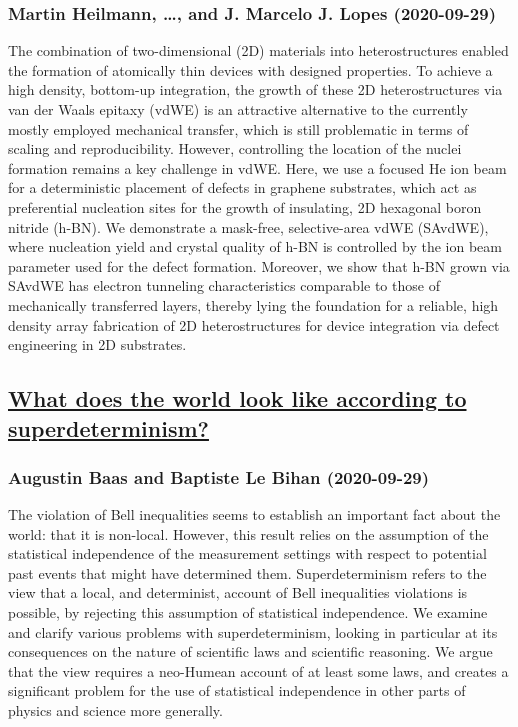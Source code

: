 \subsubsection*{Martin Heilmann, \dots, and J. Marcelo J. Lopes (2020-09-29)}
The combination of two-dimensional (2D) materials into heterostructures
enabled the formation of atomically thin devices with designed properties. To
achieve a high density, bottom-up integration, the growth of these 2D
heterostructures via van der Waals epitaxy (vdWE) is an attractive alternative
to the currently mostly employed mechanical transfer, which is still
problematic in terms of scaling and reproducibility. However, controlling the
location of the nuclei formation remains a key challenge in vdWE. Here, we use
a focused He ion beam for a deterministic placement of defects in graphene
substrates, which act as preferential nucleation sites for the growth of
insulating, 2D hexagonal boron nitride (h-BN). We demonstrate a mask-free,
selective-area vdWE (SAvdWE), where nucleation yield and crystal quality of
h-BN is controlled by the ion beam parameter used for the defect formation.
Moreover, we show that h-BN grown via SAvdWE has electron tunneling
characteristics comparable to those of mechanically transferred layers, thereby
lying the foundation for a reliable, high density array fabrication of 2D
heterostructures for device integration via defect engineering in 2D
substrates.

\subsection*{\href{http://arxiv.org/abs/2009.13908v1}{What does the world look like according to superdeterminism?}}
\subsubsection*{Augustin Baas and Baptiste Le Bihan (2020-09-29)}
The violation of Bell inequalities seems to establish an important fact about
the world: that it is non-local. However, this result relies on the assumption
of the statistical independence of the measurement settings with respect to
potential past events that might have determined them. Superdeterminism refers
to the view that a local, and determinist, account of Bell inequalities
violations is possible, by rejecting this assumption of statistical
independence. We examine and clarify various problems with superdeterminism,
looking in particular at its consequences on the nature of scientific laws and
scientific reasoning. We argue that the view requires a neo-Humean account of
at least some laws, and creates a significant problem for the use of
statistical independence in other parts of physics and science more generally.

